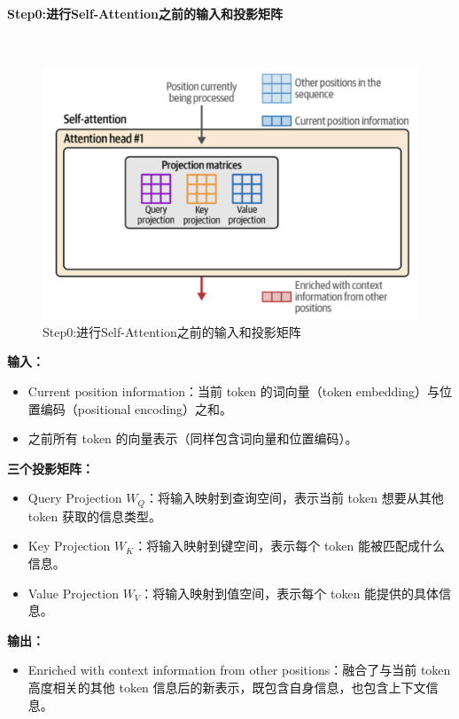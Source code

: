 \paragraph{Step0:进行Self-Attention之前的输入和投影矩阵}~{}
\begin{figure}[htbp]
  \centering
  \includegraphics[width=0.8\linewidth]{figs/lec2/lec2.12.png}
  \caption{Step0:进行Self-Attention之前的输入和投影矩阵}
  \label{fig:Step0:进行Self-Attention之前的输入和投影矩阵}
\end{figure}

\noindent\textbf{输入：}
\begin{itemize}
  \item {\color{dblue}Current position information}：当前 token 的词向量（token embedding）与位置编码（positional encoding）之和。
  \item 之前所有 token 的向量表示（同样包含词向量和位置编码）。
\end{itemize}

\noindent\textbf{三个投影矩阵：}
\begin{itemize}
  \item {\color{qpurple}Query Projection} $W_Q$：将输入映射到查询空间，表示当前 token 想要从其他 token 获取的信息类型。
  \item {\color{orange}Key Projection} $W_K$：将输入映射到键空间，表示每个 token 能被匹配成什么信息。
  \item {\color{zblue}Value Projection} $W_V$：将输入映射到值空间，表示每个 token 能提供的具体信息。
\end{itemize}

\noindent\textbf{输出：}
\begin{itemize}
  \item {\color{tred}Enriched with context information from other positions}：融合了与当前 token 高度相关的其他 token 信息后的新表示，既包含自身信息，也包含上下文信息。
\end{itemize}

